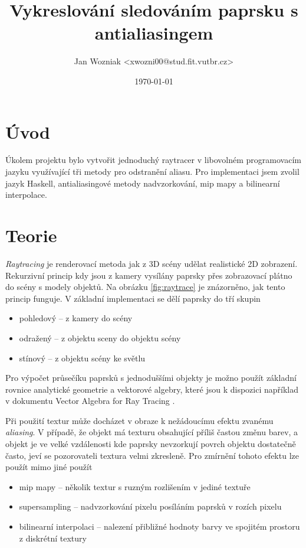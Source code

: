 \documentclass[a4paper, 12pt]{article}
\title{Vykreslování sledováním paprsku s antialiasingem}
\author{Jan Wozniak <xwozni00@stud.fit.vutbr.cz>}
\date{\today}
\begin{document}
\maketitle

\section{Úvod}

Úkolem projektu bylo vytvořit jednoduchý raytracer v libovolném programovacím jazyku využívající tři metody pro odstranění aliasu.
Pro implementaci jsem zvolil jazyk Haskell, antialiasingové metody nadvzorkování, mip mapy a bilinearní interpolace.



\section{Teorie}

\textit{Raytracing} je renderovací metoda jak z 3D scény udělat realistické 2D zobrazení. Rekurzivní princip kdy jsou z kamery vysílány paprsky
přes zobrazovací plátno do scény s modely objektů\cite{pgr}. 
Na obrázku \ref{fig:raytrace} je znázorněno, jak tento princip funguje.
V základní implementaci se dělí paprsky do tří skupin
\begin{itemize}
\item pohledový -- z kamery do scény
\item odražený -- z objektu sceny do objektu scény
\item stínový -- z objektu scény ke světlu
\end{itemize}

Pro výpočet průsečíku paprsků s jednoduššími objekty je možno použít základní rovnice analytické geometrie a vektorové algebry, které 
jsou k dispozici například v dokumentu Vector Algebra for Ray Tracing \cite{vbr}.

Při použití textur může docházet v obraze k nežádoucímu efektu zvanému \textit{aliasing}. 
V případě, že objekt má texturu obsahující příliš častou změnu barev, 
a objekt je ve velké vzdálenosti kde paprsky nevzorkují povrch objektu dostatečně často, jeví
se pozorovateli textura velmi zkresleně. Pro zmírnění tohoto efektu lze použít mimo jiné použít \cite{pgr}
\begin{itemize}
\item mip mapy -- několik textur s ruzným rozlišením v jediné textuře
\item supersampling -- nadvzorkování pixelu posíláním paprsků v rozích pixelu
\item bilinearní interpolaci -- nalezení přibližné hodnoty barvy ve spojitém prostoru z diskrétní textury
\end{itemize}
\end{document}
